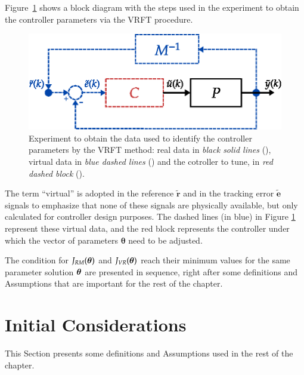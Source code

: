 Figure~\ref{fig:Figs-diagrama_VRFT-eps} shows a block diagram with the steps used in the experiment to obtain the controller parameters via the VRFT procedure.
\begin{figure}[H]
     
   \centering
   \includegraphics{Figs/diagrama_VRFT_maps.eps}
   \caption{Experiment to obtain the data used to identify the controller parameters by the VRFT method: real data in \textit{black solid lines} (), virtual data in \textit{blue dashed lines} () and the cotroller to tune, in \textit{red dashed block} ().}
   \label{fig:Figs-diagrama_VRFT-eps}
\end{figure}
The term ``virtual'' is adopted in the reference $\tilde{\bm{r}}$ and in the tracking error $\tilde{\bm{e}}$ signals to emphasize that none of these signals are physically available, but only calculated for controller design purposes. 
The dashed lines (in blue) in Figure \ref{fig:Figs-diagrama_VRFT-eps} represent these virtual data, and the red block represents the controller under which the vector of parameters $\bm{\theta}$ need to be adjusted.

The condition for  $J_{RM}(\bm{\theta})$ and $J_{VR}(\bm{\theta})$ reach their minimum values for the same parameter solution $\bm{\theta}$ are presented in sequence, right after some definitions and Assumptions that are important for the rest of the chapter.

\section{Initial Considerations}\label{sec:vrft_Init_Cons}
This Section presents some definitions and Assumptions used in the rest of the chapter.


